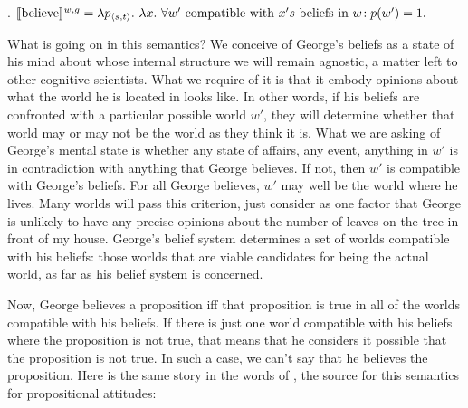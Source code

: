 \ex. $\sv{\mbox{believe}}^{w,g} =\\
\null\hfill\lambda p_{\angles{s,t}}.\ \lambda x. \ \forall w' \mbox{ compatible with } x's \mbox{ beliefs in } w\!: p(w') = 1.$

What %
%
is going on in this semantics? We conceive of George's beliefs as a state of his
mind about whose internal structure we will remain agnostic, a matter left to
other cognitive scientists. What we require of it is that it embody opinions
about what the world he is located in looks like. In other words, if his beliefs
are confronted with a particular possible world $w'$, they will determine
whether that world may or may not be the world as they think it is. What we are
asking of George's mental state is whether any state of affairs, any event,
anything in $w'$ is in contradiction with anything that George believes. If not,
then $w'$ is compatible with George's beliefs. For all George believes, $w'$ may
well be the world where he lives. Many worlds will pass this criterion, just
consider as one factor that George is unlikely to have any precise opinions
about the number of leaves on the tree in front of my house. George's belief
system determines a set of worlds compatible with his beliefs: those worlds that
are viable candidates for being the actual world, as far as his belief system is
concerned.

Now, George believes a proposition iff that proposition is true in all of the
worlds compatible with his beliefs. If there is just one world compatible with
his beliefs where the proposition is not true, that means that he considers it
possible that the proposition is not true. In such a case, we can't say that he
believes the proposition. Here is the same story in the words of
\citet{hintikka:1969:attitudes}, the source for this semantics for propositional
attitudes:


